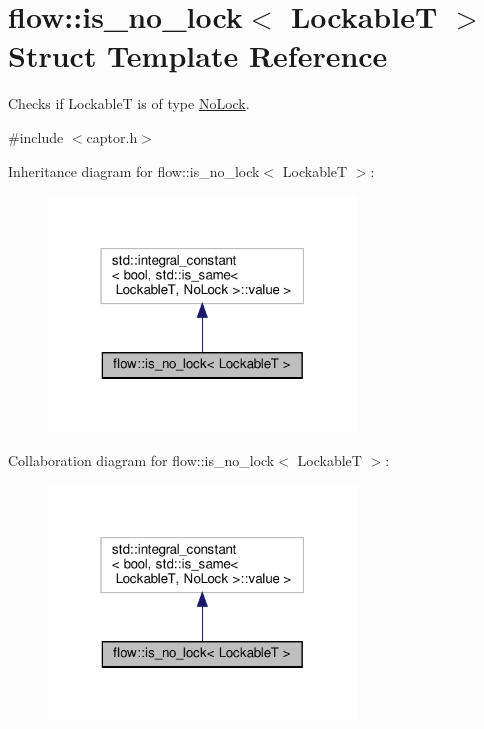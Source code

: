 \hypertarget{structflow_1_1is__no__lock}{}\section{flow\+:\+:is\+\_\+no\+\_\+lock$<$ LockableT $>$ Struct Template Reference}
\label{structflow_1_1is__no__lock}


Checks if {\ttfamily LockableT} is of type \hyperlink{structflow_1_1_no_lock}{No\+Lock}.  




{\ttfamily \#include $<$captor.\+h$>$}



Inheritance diagram for flow\+:\+:is\+\_\+no\+\_\+lock$<$ LockableT $>$\+:\nopagebreak
\begin{figure}[H]
\begin{center}
\leavevmode
\includegraphics[width=232pt]{structflow_1_1is__no__lock__inherit__graph}
\end{center}
\end{figure}


Collaboration diagram for flow\+:\+:is\+\_\+no\+\_\+lock$<$ LockableT $>$\+:\nopagebreak
\begin{figure}[H]
\begin{center}
\leavevmode
\includegraphics[width=232pt]{structflow_1_1is__no__lock__coll__graph}
\end{center}
\end{figure}


